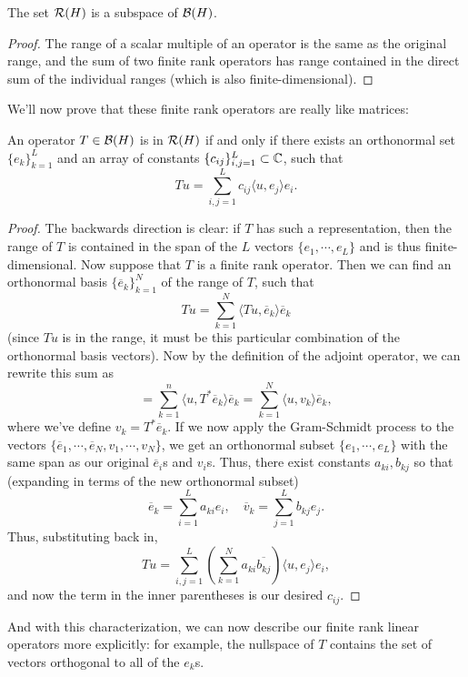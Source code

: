 \begin{proposition}
The set $\mathcal{R}(H)$ is a subspace of $\mathcal{B}(H)$.
\end{proposition}
\begin{proof}
The range of a scalar multiple of an operator is the same as the original range, and the sum of two finite rank operators has range contained in the direct sum of the individual ranges (which is also finite-dimensional).
\end{proof}

We'll now prove that these finite rank operators are really like matrices:

\begin{theorem}
An operator $T \in \mathcal{B}(H)$ is in $\mathcal{R}(H)$ if and only if there exists an orthonormal set $\{e_k\}_{k=1}^{L}$ and an array of constants $\{c_{ij}\}_{i,j=1}^L \subset \mathbb C$, such that 
\[
    Tu = \sum_{i,j=1}^{L} c_{ij} \langle u, e_j \rangle e_i.
\]
\end{theorem}
\begin{proof}
The backwards direction is clear: if $T$ has such a representation, then the range of $T$ is contained in the span of the $L$ vectors $\{e_1, \cdots, e_L\}$ and is thus finite-dimensional. Now suppose that $T$ is a finite rank operator. Then we can find an orthonormal basis $\{\overline{e}_k\}_{k=1}^N$ of the range of $T$, such that
\[
    Tu = \sum_{k=1}^{N} \langle Tu, \overline{e}_k \rangle \overline{e}_k
\]
(since $Tu$ is in the range, it must be this particular combination of the orthonormal basis vectors). Now by the definition of the adjoint operator, we can rewrite this sum as 
\[
    = \sum_{k=1}^n \langle u, T^\ast \overline{e}_k \rangle \overline{e}_k = \sum_{k=1}^N \langle u, v_k \rangle \overline{e}_k,
\]
where we've define $v_k = T^\ast \overline{e}_k$. If we now apply the Gram-Schmidt process to the vectors $\{\overline{e}_1, \cdots, \overline{e}_N, v_1, \cdots, v_N\}$, we get an orthonormal subset $\{e_1, \cdots, e_L\}$ with the same span as our original $\overline{e}_i$s and $v_i$s. Thus, there exist constants $a_{ki}, b_{kj}$ so that (expanding in terms of the new orthonormal subset)
\[
    \overline{e}_k = \sum_{i=1}^{L} a_{ki} e_i, \quad \overline{v}_k = \sum_{j=1}^L b_{kj} e_j. 
\]
Thus, substituting back in, 
\[
    Tu = \sum_{i,j=1}^{L} \left(\sum_{k=1}^N a_{ki} \overline{b_{kj}} \right) \langle u, e_j \rangle e_i,
\]
and now the term in the inner parentheses is our desired $c_{ij}$. 
\end{proof}

And with this characterization, we can now describe our finite rank linear operators more explicitly: for example, the nullspace of $T$ contains the set of vectors orthogonal to all of the $e_k$s.

